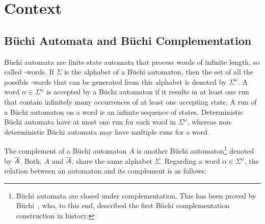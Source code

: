 

\section{Context}
\label{1_context}

\subsection{Büchi Automata and Büchi Complementation}

Büchi automata are finite state automata that process words of infinite length, so called \om-words. If $\Sigma$ is the alphabet of a Büchi automaton, then the set of all the possible \om-words that can be generated from this alphabet is denoted by $\Sigma^\omega$. A word $\alpha \in \Sigma^\omega$ is accepted by a Büchi automaton if it results in at least one run that contain infinitely many occurrences of at least one accepting state. A run of a Büchi automaton on a word is an infinite sequence of states. Deterministic Büchi automata have at most one run for each word in $\Sigma^\omega$, whereas non-deterministic Büchi automata may have multiple runs for a word.

The complement of a Büchi automaton $A$ is another Büchi automaton\footnote{Büchi automata are closed under complementation. This has been proved by Büchi~\cite{buchi1960decision}, who, to this end, described the first Büchi complementation construction in history.} denoted by $\cl1{A}$. Both, $A$ and $\cl1{A}$, share the same alphabet $\Sigma$. Regarding a word $\alpha \in \Sigma^\omega$, the relation between an automaton and its complement is as follows:

